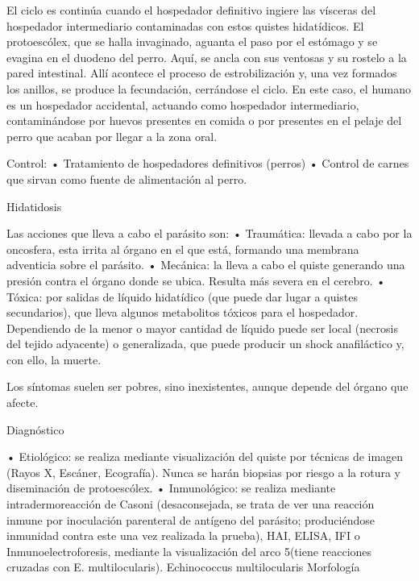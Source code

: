 El ciclo es continúa cuando el hospedador definitivo ingiere las vísceras del hospedador intermediario contaminadas con estos quistes hidatídicos. El protoescólex, que se halla invaginado, aguanta el paso por el estómago y se evagina en el duodeno del perro. Aquí, se ancla con sus ventosas y su rostelo a la pared intestinal. Allí acontece el proceso de estrobilización y, una vez formados los anillos, se produce la fecundación, cerrándose el ciclo.
En este caso, el humano es un hospedador accidental, actuando como hospedador intermediario, contaminándose por huevos presentes en comida o por presentes en el pelaje del perro que acaban por llegar a la zona oral.

Control:
• Tratamiento de hospedadores definitivos (perros)
• Control de carnes que sirvan como fuente de alimentación al perro.

Hidatidosis

Las acciones que lleva a cabo el parásito son:
• Traumática: llevada a cabo por la oncosfera, esta irrita al órgano en el que está, formando una membrana adventicia sobre el parásito.
• Mecánica: la lleva a cabo el quiste generando una presión contra el órgano donde se ubica. Resulta más severa en el cerebro.
• Tóxica: por salidas de líquido hidatídico (que puede dar lugar a quistes secundarios), que lleva algunos metabolitos tóxicos para el hospedador. Dependiendo de la menor o mayor cantidad de líquido puede ser local (necrosis del tejido adyacente) o generalizada, que puede producir un shock anafiláctico y, con ello, la muerte.

Los síntomas suelen ser pobres, sino inexistentes, aunque depende del órgano que afecte.

Diagnóstico

• Etiológico: se realiza mediante visualización del quiste por técnicas de imagen (Rayos X, Escáner, Ecografía). Nunca se harán biopsias por riesgo a la rotura y diseminación de protoescólex.
• Inmunológico: se realiza mediante intradermoreacción de Casoni (desaconsejada, se trata de ver una reacción inmune por inoculación parenteral de antígeno del parásito; produciéndose inmunidad contra este una vez realizada la prueba), HAI, ELISA, IFI o Inmunoelectroforesis, mediante la visualización del arco 5(tiene reacciones cruzadas con E. multilocularis).
\newpage
Echinococcus multilocularis
Morfología

